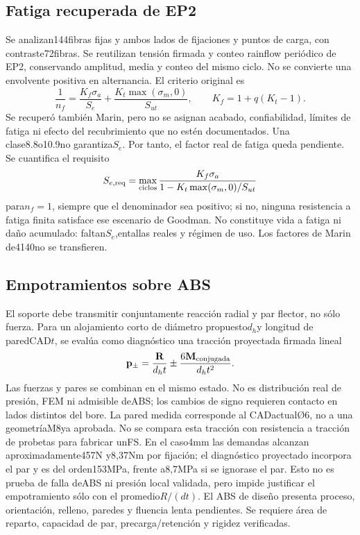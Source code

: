 \subsection{Fatiga recuperada de EP2}
Se analizan144fibras fijas y ambos lados de fijaciones y puntos de carga, con contraste72fibras.
Se reutilizan tensión firmada y conteo rainflow periódico de EP2, conservando amplitud,
media y conteo del mismo ciclo. No se convierte una envolvente positiva en alternancia.
El criterio original es
\[
\frac1{n_f}=\frac{K_f\sigma_a}{S_e}
 +\frac{K_t\max(\sigma_m,0)}{S_{ut}},\qquad K_f=1+q(K_t-1).
\]
Se recuperó también Marin, pero no se asignan acabado, confiabilidad, límites de fatiga
ni efecto del recubrimiento que no estén documentados. Una clase8.8o10.9no garantiza$S_e$.
Por tanto, el factor real de fatiga queda pendiente. Se cuantifica el requisito
\[
S_{e,\rm req}=\max_{\rm ciclos}\frac{K_f\sigma_a}
 {1-K_t\max(\sigma_m,0)/S_{ut}}
\]
para$n_f=1$, siempre que el denominador sea positivo; si no, ninguna resistencia a fatiga
finita satisface ese escenario de Goodman. No constituye vida a fatiga ni daño acumulado:
faltan$S_e$,entallas reales y régimen de uso. Los factores de Marin de4140no se transfieren.

\subsection{Empotramientos sobre ABS}
El soporte debe transmitir conjuntamente reacción radial y par flector, no sólo fuerza.
Para un alojamiento corto de diámetro propuesto$d_h$y longitud de paredCAD$t$,
se evalúa como diagnóstico una tracción proyectada firmada lineal
\[
\mathbf p_\pm=\frac{\mathbf R}{d_ht}\pm\frac{6\mathbf M_{\rm conjugada}}{d_ht^2}.
\]
Las fuerzas y pares se combinan en el mismo estado. No es distribución real de presión,
FEM ni admisible deABS; los cambios de signo requieren contacto en lados distintos del bore.
La pared medida corresponde al CADactualØ6, no a una geometríaM8ya aprobada.
No se compara esta tracción con resistencia a tracción de probetas para fabricar unFS.
En el caso4mm las demandas alcanzan aproximadamente457N y8,37Nm por fijación;
el diagnóstico proyectado incorpora el par y es del orden153MPa, frente a8,7MPa
si se ignorase el par. Esto no es prueba de falla deABS ni presión local validada,
pero impide justificar el empotramiento sólo con el promedio$R/(dt)$.
El ABS de diseño presenta proceso, orientación, relleno, paredes y fluencia lenta pendientes.
Se requiere área de reparto, capacidad de par, precarga/retención y rigidez verificadas.

